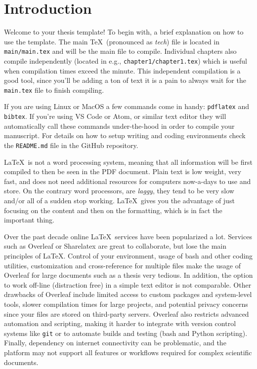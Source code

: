 
\chapter{Introduction}

Welcome to your thesis template! To begin with, a brief explanation on how to use the template. The main \TeX\ (pronounced as \textit{tech}) file is located in \texttt{main/main.tex} and will be the main file to compile. Individual chapters also compile independently (located in e.g., \texttt{chapter1/chapter1.tex}) which is useful when compilation times exceed the minute. This independent compilation is a good tool, since you'll be adding a ton of text it is a pain to always wait for the \texttt{main.tex} file to finish compiling.

If you are using Linux or MacOS a few commands come in handy: \texttt{pdflatex} and \texttt{\texttt{bibtex}}. If you're using VS Code or Atom, or similar text editor they will automatically call these commands under-the-hood in order to compile your manuscript. For details on how to setup writing and coding environments check the \texttt{README.md} file in the GitHub repository.

\LaTeX\ is not a word processing system, meaning that all information will be first compiled to then be seen in the PDF document. Plain text is low weight, very fast, and does not need additional resources for computers now-a-days to use and store. On the contrary word processors, are \textit{laggy}, they tend to be very slow and/or all of a sudden stop working. \LaTeX\ gives you the advantage of just focusing on the content and then on the formatting, which is in fact the important thing.

Over the past decade online \LaTeX\ services have been popularized a lot. Services such as Overleaf or Sharelatex are great to collaborate, but lose the main principles of \LaTeX. Control of your environment, usage of bash and other coding utilities, customization and cross-reference for multiple files make the usage of Overleaf for large documents such as a thesis very tedious. In addition, the option to work off-line (distraction free) in a simple text editor is not comparable.
%
Other drawbacks of Overleaf include limited access to custom packages and system-level tools, slower compilation times for large projects, and potential privacy concerns since your files are stored on third-party servers. Overleaf also restricts advanced automation and scripting, making it harder to integrate with version control systems like \texttt{git} or to automate builds and testing (bash and Python scripting). Finally, dependency on internet connectivity can be problematic, and the platform may not support all features or workflows required for complex scientific documents.


